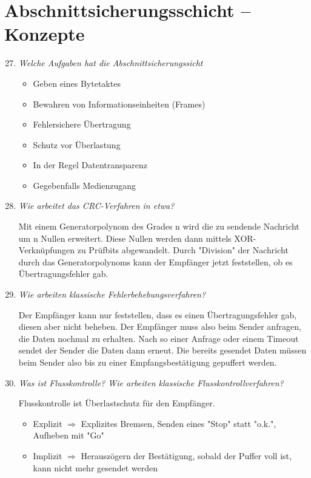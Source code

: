 \documentclass[hidelinks]{article}
\begin{document}
\section{Abschnittsicherungsschicht -- Konzepte}
\begin{enumerate}
\setcounter{enumi}{26}
\item \textit{Welche Aufgaben hat die Abschnittsicherungssicht}
\begin{itemize}
\item Geben eines Bytetaktes
\item Bewahren von Informationseinheiten (Frames)
\item Fehlersichere Übertragung
\item Schutz vor Überlastung
\item In der Regel Datentransparenz
\item Gegebenfalls Medienzugang
\end{itemize}
\item \textit{Wie arbeitet das CRC-Verfahren in etwa?}

Mit einem Generatorpolynom des Grades n wird die zu sendende Nachricht um n Nullen erweitert. Diese Nullen werden dann mittels XOR-Verknüpfungen zu Prüfbits abgewandelt. Durch "Division" der Nachricht durch das Generatorpolynoms kann der Empfänger jetzt feststellen, ob es Übertragungsfehler gab.

\item \textit{Wie arbeiten klassische Fehlerbehebungsverfahren?}

Der Empfänger kann nur feststellen, dass es einen Übertragungsfehler gab, diesen aber nicht beheben. Der Empfänger muss also beim Sender anfragen, die Daten nochmal zu erhalten. Nach so einer Anfrage oder einem Timeout sendet der Sender die Daten dann erneut. Die bereits gesendet Daten müssen beim Sender also bis zu einer Empfangsbestätigung gepuffert werden.

\item \textit{Was ist Flusskontrolle? Wie arbeiten klassische Flusskontrollverfahren?}

Flusskontrolle ist Überlastschutz für den Empfänger.
\begin{itemize}
\item Explizit $\Rightarrow$ Explizites Bremsen, Senden eines "Stop" statt "o.k.", Aufheben mit "Go"
\item Implizit $\Rightarrow$ Herauszögern der Bestätigung, sobald der Puffer voll ist, kann nicht mehr gesendet werden
\end{itemize}
\end{enumerate}
\end{document}
